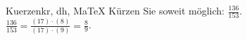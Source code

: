 \begin{MAufgabe}{Kuerzen}{kr, dh, MaTeX}
K\"urzen Sie soweit m\"oglich: $\frac{136}{153}$.\\ 
\ifLsg\MLoesung
\quad $\frac{136}{153}=\frac{(17)\cdot(8)}{(17)\cdot(9)}=\frac{8}{9}$.\else\relax\fi
 \end{MAufgabe}